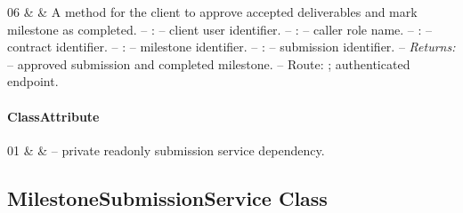 \begin{ClassMethodTable}
06 & \newline{}\newline{}\newline{} &
A method for the client to approve accepted deliverables and mark milestone as completed.
\newline -- :  -- client user identifier.
\newline -- :  -- caller role name.
\newline -- :  -- contract identifier.
\newline -- :  -- milestone identifier.
\newline -- :  -- submission identifier.
\newline -- \textit{Returns:}  -- approved submission and completed milestone.
\newline -- Route: ; authenticated endpoint. \\ \hline
\end{ClassMethodTable}

\paragraph{ClassAttribute}
\begin{ClassAttributeTable}
01 &  &  -- private readonly submission service dependency. \\ \hline
\end{ClassAttributeTable}

\subsection{MilestoneSubmissionService Class}

